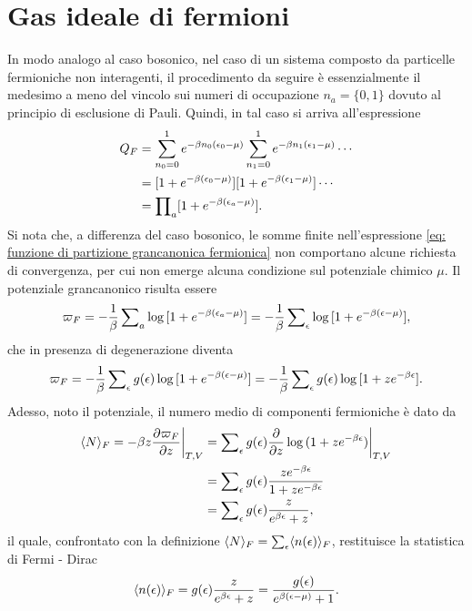 \section{Gas ideale di fermioni}
In modo analogo al caso bosonico, nel caso di un sistema composto da particelle fermioniche non interagenti, il procedimento da seguire è essenzialmente il medesimo a meno del vincolo sui numeri di occupazione $n_a = \{0,1\}$ dovuto al principio di esclusione di Pauli. Quindi, in tal caso si arriva all'espressione
\begin{equation}
\label{eq: funzione di partizione grancanonica fermionica}
    \begin{split}
        Q_F &= \sum_{n_0 = 0}^1e^{-\beta n_0(\epsilon_0 - \mu)}\sum_{n_1 = 0}^1e^{-\beta n_1(\epsilon_1 - \mu)}\cdots \\
        &= [1 + e^{-\beta(\epsilon_0 - \mu)}][1 + e^{-\beta(\epsilon_1 - \mu)}]\cdots \\
        &= \prod\nolimits_a[1 + e^{-\beta(\epsilon_a - \mu)}].
    \end{split}
\end{equation}
Si nota che, a differenza del caso bosonico, le somme finite nell'espressione \eqref{eq: funzione di partizione grancanonica fermionica} non comportano alcune richiesta di convergenza, per cui non emerge alcuna condizione sul potenziale chimico $\mu$. Il potenziale grancanonico risulta essere
\begin{equation}
    \varpi_F = -\frac{1}{\beta}\sum\nolimits_a\log{[1 + e^{-\beta(\epsilon_a - \mu)}]} = -\frac{1}{\beta}\sum\nolimits_\epsilon \log{[1 + e^{-\beta(\epsilon - \mu)}]},
\end{equation}
che in presenza di degenerazione diventa
\begin{equation}
    \varpi_F = -\frac{1}{\beta}\sum\nolimits_\epsilon g(\epsilon)\log{[1 + e^{-\beta(\epsilon - \mu)}]} = -\frac{1}{\beta}\sum\nolimits_\epsilon g(\epsilon) \log{[1 + ze^{-\beta\epsilon}]}.
\end{equation}
Adesso, noto il potenziale, il numero medio di componenti fermioniche è dato da
\begin{equation}
    \begin{split}
        \langle N \rangle_F = -\beta z \frac{\partial \varpi_F}{\partial z}\bigg|_{T,V} &= \sum\nolimits_\epsilon g(\epsilon)\frac{\partial}{\partial z}\log{(1 + ze^{-\beta\epsilon})}\bigg|_{T,V} \\
        &= \sum\nolimits_\epsilon g(\epsilon)\frac{ze^{-\beta\epsilon}}{1 + ze^{-\beta\epsilon}} \\
        &= \sum\nolimits_\epsilon g(\epsilon)\frac{z}{e^{\beta\epsilon} + z},
    \end{split}
\end{equation}
il quale, confrontato con la definizione $\langle N \rangle_F = \sum\nolimits_\epsilon \langle n(\epsilon) \rangle_F$, restituisce la statistica di Fermi - Dirac
\begin{equation}
\label{eq: statistica Fermi-Dirac}
    \langle n(\epsilon) \rangle_F = g(\epsilon)\frac{z}{e^{\beta\epsilon} + z} = \frac{g(\epsilon)}{e^{\beta(\epsilon - \mu)} + 1}.
\end{equation}

